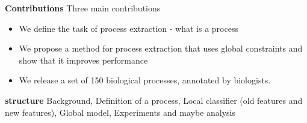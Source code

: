 \textbf{Contributions} Three main contributions
\begin{itemize}
\item We define the task of process extraction - what is a process
\item We propose a method for process extraction that uses global constraints and show that it improves performance
\item We release a set of 150 biological processes, annotated by biologists.
\end{itemize}

\textbf{structure} Background, Definition of a process, Local classifier (old features and new features), Global model, Experiments and maybe analysis